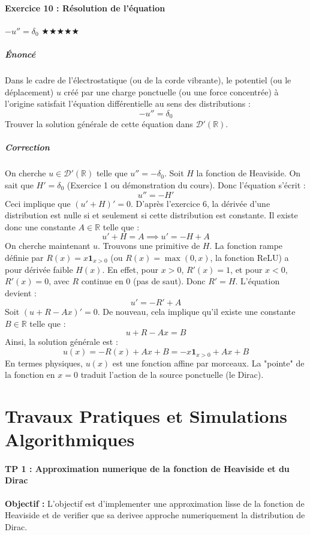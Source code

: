 \documentclass[11pt,a4paper]{article}
\begin{document}
\subsection*{Exercice 10 : Résolution de l'équation}$-u'' = \delta_0$  \quad $\bigstar\bigstar\bigstar\bigstar\bigstar$


\subsubsection*{Énoncé}
Dans le cadre de l'électrostatique (ou de la corde vibrante), le potentiel (ou le déplacement) $u$ créé par une charge ponctuelle (ou une force concentrée) à l'origine satisfait l'équation différentielle au sens des distributions :
$$ -u'' = \delta_0 $$
Trouver la solution générale de cette équation dans $\mathcal{D}'(\mathbb{R})$.

\subsubsection*{Correction}
On cherche $u \in \mathcal{D}'(\mathbb{R})$ telle que $u'' = -\delta_0$.
Soit $H$ la fonction de Heaviside. On sait que $H' = \delta_0$ (Exercice 1 ou démonstration du cours).
Donc l'équation s'écrit :
$$ u'' = -H' $$
Ceci implique que $(u' + H)' = 0$.
D'après l'exercice 6, la dérivée d'une distribution est nulle si et seulement si cette distribution est constante.
Il existe donc une constante $A \in \mathbb{R}$ telle que :
$$ u' + H = A \implies u' = -H + A $$
On cherche maintenant $u$.
Trouvons une primitive de $H$. La fonction rampe définie par $R(x) = x \mathbf{1}_{x>0}$ (ou $R(x) = \max(0,x)$, la fonction ReLU) a pour dérivée faible $H(x)$.
En effet, pour $x>0$, $R'(x)=1$, et pour $x<0$, $R'(x)=0$, avec $R$ continue en 0 (pas de saut). Donc $R' = H$.
L'équation devient :
$$ u' = -R' + A $$
Soit $(u + R - Ax)' = 0$.
De nouveau, cela implique qu'il existe une constante $B \in \mathbb{R}$ telle que :
$$ u + R - Ax = B $$
Ainsi, la solution générale est :
$$ u(x) = -R(x) + Ax + B = -x \mathbf{1}_{x>0} + Ax + B $$
En termes physiques, $u(x)$ est une fonction affine par morceaux. La "pointe" de la fonction en $x=0$ traduit l'action de la source ponctuelle (le Dirac).




\newpage
\part{Travaux Pratiques et Simulations Algorithmiques}
\subsection*{TP 1 : Approximation numerique de la fonction de Heaviside et du Dirac }
\textbf{Objectif :} L'objectif est d'implementer une approximation lisse de la fonction de Heaviside et de verifier que sa derivee approche numeriquement la distribution de Dirac.
\end{document}
